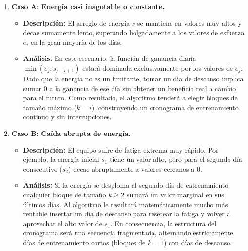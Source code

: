 \begin{enumerate}
    \item \textbf{Caso A: Energía casi inagotable o constante.}
    \begin{itemize}
        \item \textbf{Descripción:} El arreglo de energía $s$ se mantiene en valores muy altos y decae sumamente lento, superando holgadamente a los valores de esfuerzo $e_i$ en la gran mayoría de los días.
        \item \textbf{Análisis:} En este escenario, la función de ganancia diaria $\min(e_j, s_{j-i+1})$ estará dominada exclusivamente por los valores de $e_j$. Dado que la energía no es un limitante, tomar un día de descanso implica sumar $0$ a la ganancia de ese día sin obtener un beneficio real a cambio para el futuro. Como resultado, el algoritmo tenderá a elegir bloques de tamaño máximo ($k=i$), construyendo un cronograma de entrenamiento continuo y sin interrupciones.
    \end{itemize}

    \begin{figure}[H]
        \centering
    \end{figure}

    \item \textbf{Caso B: Caída abrupta de energía.}
    \begin{itemize}
        \item \textbf{Descripción:} El equipo sufre de fatiga extrema muy rápido. Por ejemplo, la energía inicial $s_1$ tiene un valor alto, pero para el segundo día consecutivo ($s_2$) decae abruptamente a valores cercanos a $0$.
        \item \textbf{Análisis:} Si la energía se desploma al segundo día de entrenamiento, cualquier bloque de tamaño $k \ge 2$ sumará un valor marginal en sus últimos días. Al algoritmo le resultará matemáticamente mucho más rentable insertar un día de descanso para resetear la fatiga y volver a aprovechar el alto valor de $s_1$. En consecuencia, la estructura del cronograma será una secuencia fragmentada, alternando estrictamente días de entrenamiento cortos (bloques de $k=1$) con días de descanso.
    \end{itemize}


\end{enumerate}

